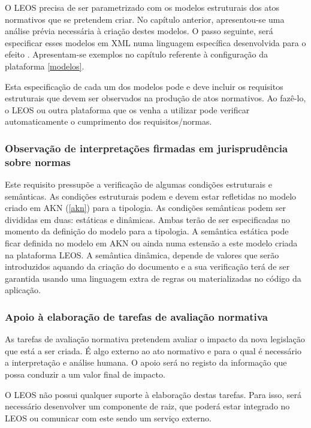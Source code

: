 O LEOS precisa de ser parametrizado com os modelos estruturais dos atos normativos que se pretendem criar.
No capítulo anterior, apresentou-se uma análise prévia necessária à criação destes modelos. 
O passo seguinte, será 
especificar esses modelos em XML numa linguagem específica desenvolvida para o efeito \cite{VPCB2018}.
Apresentam-se exemplos no capítulo referente à configuração da plataforma \ref{modelos}.

Esta especificação de cada um dos modelos pode e deve incluir os requisitos estruturais que devem ser observados na 
produção de atos normativos. Ao fazê-lo, o LEOS ou outra plataforma que os venha a utilizar pode verificar automaticamente 
o cumprimento dos requisitos/normas.

\subsubsection{Observação de interpretações firmadas em jurisprudência sobre normas}

Este requisito pressupõe a verificação de algumas condições estruturais e semânticas.
As condições estruturais podem e devem estar refletidas no modelo criado em AKN (\ref{akn}) para a tipologia.
As condições semânticas podem ser divididas em duas: estáticas e dinâmicas.
Ambas terão de ser especificadas no momento da definição do modelo para a tipologia. 
A semântica estática pode ficar definida no modelo em AKN ou ainda numa estensão a este modelo criada na plataforma LEOS.
A semântica dinâmica, depende de valores que serão introduzidos aquando da criação do documento e a sua verificação terá 
de ser garantida usando uma linguagem extra de regras ou materializadas no código da aplicação.

\subsubsection{Apoio à elaboração de tarefas de avaliação normativa}

As tarefas de avaliação normativa pretendem avaliar o impacto da nova legislação que está a ser criada.
É algo externo ao ato normativo e para o qual é necessário a interpretação e análise humana.
O apoio será no registo da informação que possa conduzir a um valor final de impacto. 

O LEOS não possui qualquer suporte à elaboração destas tarefas.
Para isso, será necessário desenvolver um componente de raiz, que poderá estar integrado no LEOS ou comunicar com este 
sendo um serviço externo.

